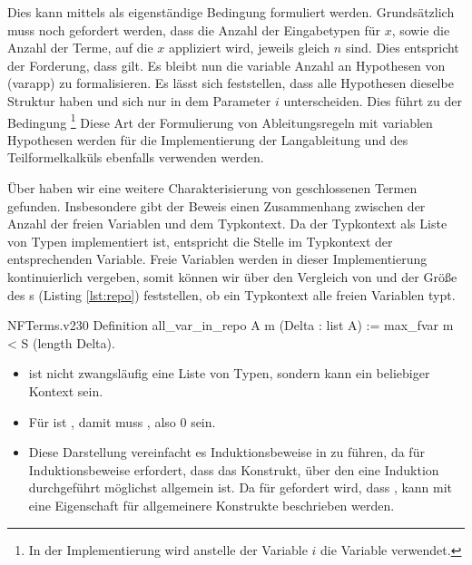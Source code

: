 Dies kann mittels  als eigenständige Bedingung formuliert werden. Grundsätzlich muss noch gefordert werden, dass die Anzahl der Eingabetypen für $x$, sowie die Anzahl der Terme, auf die $x$ appliziert wird, jeweils gleich $n$ sind. Dies entspricht der Forderung, dass  gilt. Es bleibt nun die variable Anzahl an Hypothesen von (varapp) zu formalisieren. Es lässt sich feststellen, dass alle Hypothesen dieselbe Struktur haben und sich nur in dem Parameter $i$ unterscheiden. Dies führt zu der Bedingung \footnote{In der Implementierung wird anstelle der Variable $i$ die Variable  verwendet.} Diese Art der Formulierung von Ableitungsregeln mit variablen Hypothesen werden für die Implementierung der Langableitung und des Teilformelkalküls ebenfalls verwenden werden. 

Über  haben wir eine weitere Charakterisierung von geschlossenen Termen gefunden. Insbesondere gibt der Beweis einen Zusammenhang zwischen der Anzahl der freien Variablen und dem Typkontext. Da der Typkontext als Liste von Typen implementiert ist, entspricht die Stelle im Typkontext der entsprechenden Variable. Freie Variablen werden in dieser Implementierung kontinuierlich vergeben, somit können wir über den Vergleich von  und der Größe des s (Listing \ref{lst:repo}) feststellen, ob ein Typkontext alle freien Variablen typt.

\begin{code}{NFTerms.v}{}{230}
Definition all_var_in_repo {A} m (Delta : list A) := 
    max_fvar m < S (length Delta).
\end{code}
\begin{remark}
    \begin{itemize}
    \item {} ist nicht zwangsläufig eine Liste von Typen, sondern kann ein beliebiger Kontext sein.
    \item Für  ist , damit muss , also $0$ sein.
    \item Diese Darstellung vereinfacht es Induktionsbeweise in \coq{} zu führen, da \coq{} für Induktionsbeweise erfordert, dass das Konstrukt, über den eine Induktion durchgeführt möglichst allgemein ist. Da für  gefordert wird, dass , kann mit  eine Eigenschaft für allgemeinere Konstrukte beschrieben werden.
    \end{itemize}
\end{remark}

